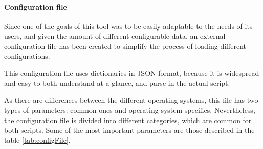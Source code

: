 \pagebreak
\paragraph{Configuration file}

Since one of the goals of this tool was to be easily adaptable to the needs of its users, and given the amount of different configurable data, an external configuration file has been created to simplify the process of loading different configurations.

This configuration file uses dictionaries in JSON format, because it is widespread and easy to both understand at a glance, and parse in the actual script.

As there are differences between the different operating systems, this file has two types of parameters: common ones and operating system specifics. Nevertheless, the configuration file is divided into different categories, which are common for both scripts. Some of the most important parameters are those described in the table \ref{tab:configFile}.\\

